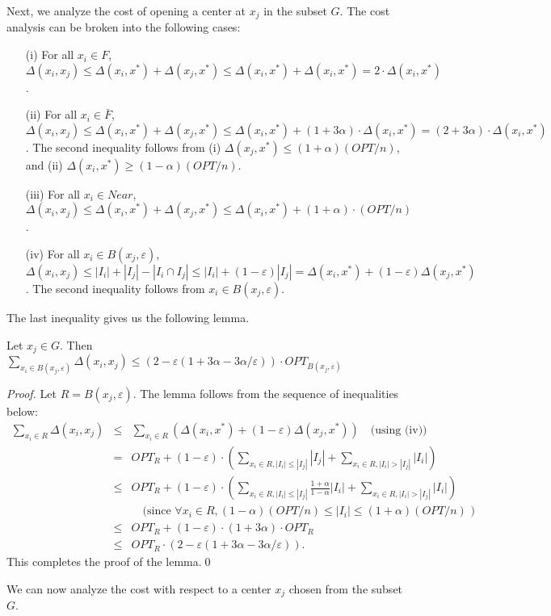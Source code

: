 \documentclass[11pt]{llncs}
\newcommand{\veps}{\varepsilon}
\begin{document}
Next, we analyze the cost of opening a center at $x_j$ in the subset $G$. The cost analysis can be broken into the following cases:
\begin{enumerate}
\item[(i)] For all $x_i \in F$, $\Delta(x_i, x_j) \leq \Delta(x_i, x^*) + \Delta(x_j, x^*) \leq \Delta(x_i, x^*) + \Delta(x_i, x^*) = 2 \cdot \Delta(x_i, x^*)$.
\item[(ii)] For all $x_i \in \bar{F}$, $\Delta(x_i, x_j) \leq \Delta(x_i, x^*) + \Delta(x_j, x^*) \leq \Delta(x_i, x^*) + (1+3\alpha) \cdot \Delta(x_i, x^*) = (2+3\alpha) \cdot \Delta(x_i, x^*)$. The second inequality follows from (i) $\Delta(x_j, x^*) \leq (1+\alpha) (OPT/n)$, and (ii) $\Delta(x_i, x^*) \geq (1-\alpha)(OPT/n)$.
\item[(iii)] For all $x_i \in Near$, $\Delta(x_i, x_j) \leq \Delta(x_i, x^*) + \Delta(x_j, x^*) \leq \Delta(x_i, x^*) + (1+\alpha)\cdot (OPT/n)$.
\item[(iv)] For all $x_i \in B(x_j, \veps)$,  $\Delta(x_i, x_j) \leq |I_i| + |I_j| - |I_i \cap I_j| \leq |I_i| + (1-\veps) |I_j| = \Delta(x_i, x^*) + (1-\veps) \Delta(x_j, x^*)$. The second inequality follows from $x_i \in B(x_j, \veps)$.
\end{enumerate}



The last inequality gives us the following lemma.



\begin{lemma}\label{lemma:4}
Let $x_j \in G$. Then $\sum_{x_i \in B(x_j, \veps)} \Delta(x_i, x_j) \leq \left(2 - \veps (1+3\alpha-3\alpha/\veps)\right) \cdot OPT_{B(x_j, \veps)}$
\end{lemma}
\begin{proof}
Let $R = B(x_j, \veps)$. The lemma follows from the sequence of inequalities below:
\begin{eqnarray*}
\sum_{x_i \in R} \Delta(x_i, x_j) &\leq& \sum_{x_i \in R} \left( \Delta(x_i, x^*) + (1-\veps) \Delta(x_j, x^*)\right) \quad \textrm{(using (iv))}\\
&=& OPT_{R} + (1-\veps) \cdot \left( \sum_{x_i \in R, |I_i| \leq |I_j|} |I_j| + \sum_{x_i \in R, |I_i| > |I_j|} |I_i|\right)\\
&\leq& OPT_{R} + (1-\veps) \cdot \left( \sum_{x_i \in R, |I_i| \leq |I_j|} \frac{1+\alpha}{1-\alpha}|I_i| + \sum_{x_i \in R, |I_i| > |I_j|} |I_i|\right) \\
&& \quad \textrm{(since $\forall x_i\in R, (1-\alpha) (OPT/n) \leq |I_i| \leq (1+\alpha) (OPT/n)$ )}\\
&\leq& OPT_R + (1-\veps) \cdot (1+3\alpha) \cdot OPT_R\\
&\leq& OPT_R \cdot \left(2 - \veps (1+3\alpha-3\alpha/\veps)\right).
\end{eqnarray*}
This completes the proof of the lemma.\qed
\end{proof}
We can now analyze the cost with respect to a center $x_j$ chosen from the subset $G$.
\end{document}
